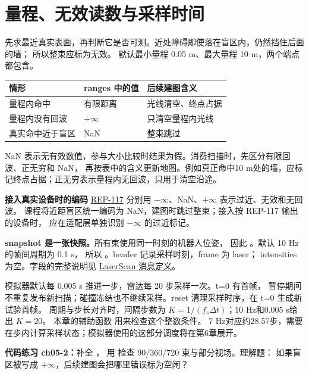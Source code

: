 \section{量程、无效读数与采样时间}
先求最近真实表面，再判断它是否可测。近处障碍即使落在盲区内，仍然挡住后面的墙；
所以整束应标为无效。
默认最小量程 0.05 m、最大量程 10 m，两个端点都包含。

\begin{center}
\begin{tabular}{lll}
\toprule
情形 & ranges 中的值 & 后续建图含义\\
\midrule
量程内命中 & 有限距离 & 光线清空、终点占据\\
量程内没有回波 & $+\infty$ & 只清空量程内光线\\
真实命中近于盲区 & NaN & 整束跳过\\
\bottomrule
\end{tabular}
\end{center}
NaN 表示无有效数值，参与大小比较时结果为假。消费扫描时，先区分有限回波、正无穷和 NaN，
再按表中的含义更新地图。例如真正命中10 m处的墙，应标记终点占据；正无穷表示量程内无回波，只用于清空沿途。

\begin{notebox}
\textbf{接入真实设备时的编码}\quad
\href{https://raw.githubusercontent.com/ros-infrastructure/rep/master/rep-0117.rst}{REP-117}
分别用 $-\infty$、NaN、$+\infty$ 表示过近、无效和无回波。
课程将近距盲区统一编码为 NaN，建图时跳过整束；接入按 REP-117 输出的设备时，
应在适配层单独识别 $-\infty$ 的过近标记。
\end{notebox}

\textbf{snapshot 是一张快照。}\quad 所有束使用同一时刻的机器人位姿，
因此 。默认 10 Hz 的帧间周期为 0.1 s，
所以 。header 记录采样时刻，frame 为 laser；
intensities 为空。字段的完整说明见
\href{https://raw.githubusercontent.com/ros2/common_interfaces/rolling/sensor_msgs/msg/LaserScan.msg}{LaserScan 消息定义}。

模拟器默认每 0.005 s 推进一步，雷达每 20 步采样一次。t=0 有首帧，
暂停期间不重复发布新扫描；碰撞冻结也不继续采样。reset 清理采样时序，在 t=0 生成新试验首帧。
周期与步长对齐时，间隔步数为 $K=1/(f_s\Delta t)$；10 Hz和0.005 s给出 $K=20$。
本章的辅助函数  用来检查这个整数条件。
7 Hz对应约28.57步，需要在步内计算采样状态；模拟器使用的这部分调度将在第6章展开。

\textbf{代码练习 ch05-2：}补全 ，
用  检查 90/360/720 束与部分视场。理解题：
如果盲区被写成 $+\infty$，后续建图会把哪里错误标为空闲？

